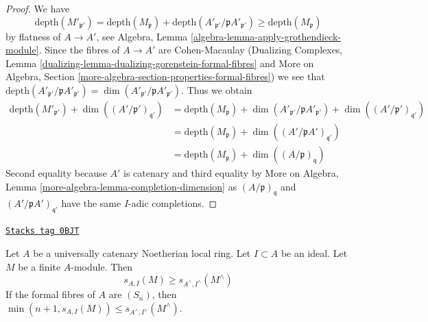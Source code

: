 \begin{proof}
We have
$$
\text{depth}(M'_{\mathfrak p'}) =
\text{depth}(M_\mathfrak p) +
\text{depth}(A'_{\mathfrak p'}/\mathfrak p A'_{\mathfrak p'})
\geq \text{depth}(M_\mathfrak p)
$$
by flatness of $A \to A'$, see
Algebra, Lemma \ref{algebra-lemma-apply-grothendieck-module}.
Since the fibres of $A \to A'$ are Cohen-Macaulay
(Dualizing Complexes, Lemma
\ref{dualizing-lemma-dualizing-gorenstein-formal-fibres} and
More on Algebra, Section
\ref{more-algebra-section-properties-formal-fibres})
we see that
$\text{depth}(A'_{\mathfrak p'}/\mathfrak p A'_{\mathfrak p'}) =
\dim(A'_{\mathfrak p'}/\mathfrak p A'_{\mathfrak p'})$.
Thus we obtain
\begin{align*}
\text{depth}(M'_{\mathfrak p'}) +
\dim((A'/\mathfrak p')_{\mathfrak q'})
& =
\text{depth}(M_\mathfrak p) +
\dim(A'_{\mathfrak p'}/\mathfrak p A'_{\mathfrak p'}) +
\dim((A'/\mathfrak p')_{\mathfrak q'}) \\
& =
\text{depth}(M_\mathfrak p) +
\dim((A'/\mathfrak p A')_{\mathfrak q'}) \\
& =
\text{depth}(M_\mathfrak p) +
\dim((A/\mathfrak p)_\mathfrak q)
\end{align*}
Second equality because $A'$ is catenary and third equality by
More on Algebra, Lemma \ref{more-algebra-lemma-completion-dimension}
as $(A/\mathfrak p)_\mathfrak q$ and $(A'/\mathfrak p A')_{\mathfrak q'}$
have the same $I$-adic completions.
\end{proof}


\begin{lemma}
\label{local-cohomology-lemma-cutoff-completion}
\href{https://stacks.math.columbia.edu/tag/0BJT}{\texttt{Stacks tag 0BJT}}

Let $A$ be a universally catenary Noetherian local ring.
Let $I \subset A$ be an ideal. Let $M$ be
a finite $A$-module. Then
$$
s_{A, I}(M) \geq s_{A^\wedge, I^\wedge}(M^\wedge)
$$
If the formal fibres of $A$ are $(S_n)$, then
$\min(n + 1, s_{A, I}(M)) \leq s_{A^\wedge, I^\wedge}(M^\wedge)$.
\end{lemma}

